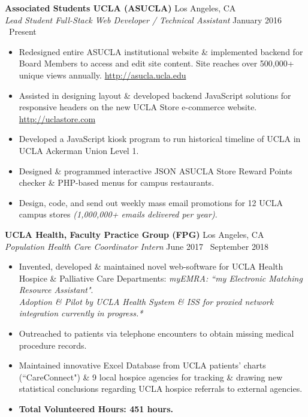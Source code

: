 \documentclass[margin]{res}
\begin{document}
\begin{resume}
		{\bf Associated Students UCLA (ASUCLA)} \hfill Los Angeles, CA \\
		{\it Lead Student Full-Stack Web Developer / Technical Assistant} \hfill January 2016 \textendash\ Present
		\begin{itemize} \itemsep -2pt
			\item Redesigned entire ASUCLA institutional website \& implemented backend for Board Members to access and edit site content. Site reaches over 500,000+ unique views annually. \textcolor{RoyalBlue}{\url{http://asucla.ucla.edu}}
			\item Assisted in designing layout \& developed backend JavaScript solutions for responsive headers on the new UCLA Store e-commerce website. \textcolor{RoyalBlue}{\url{http://uclastore.com}}
			\item Developed a JavaScript kiosk program to run historical timeline of UCLA in UCLA Ackerman Union Level 1.
			\item Designed \& programmed interactive JSON ASUCLA Store Reward Points checker \& PHP-based menus for campus restaurants.
			\item Design, code, and send out weekly mass email promotions for 12 UCLA campus stores {\it (1,000,000+ emails delivered per year)}.
		\end{itemize}
		
		{\bf UCLA Health, Faculty Practice Group (FPG)} \hfill Los Angeles, CA \\
		{\it Population Health Care Coordinator Intern} \hfill June 2017 \textendash\ September 2018
		\begin{itemize} \itemsep -2pt
			\item Invented, developed \& maintained novel web-software for UCLA Health Hospice \& Palliative Care Departments: {\it myEMRA\textsuperscript{\textregistered}: ``my Electronic Matching Resource Assistant"}.  \\ {\sl *Adoption \& Pilot by UCLA Health System \& ISS for proxied network integration currently in progress.*}
			\item Outreached to patients via telephone encounters to obtain missing medical procedure records.
			\item Maintained innovative Excel Database from UCLA patients' charts (``CareConnect") \& 9 local hospice agencies for tracking \& drawing new statistical conclusions regarding UCLA hospice referrals to external agencies.
			\item {\bf Total Volunteered Hours: 451 hours.}
		\end{itemize}
		

\end{resume}
\end{document}
